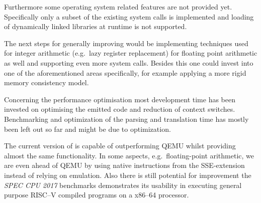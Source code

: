 Furthermore some operating system related features are not provided yet.
Specifically only a subset of the existing system calls is implemented and loading of dynamically linked libraries at runtime is not supported.

The next steps for generally improving \translatorname would be implementing techniques used for integer arithmetic (e.g.\ lazy register replacement) for floating point arithmetic as well and supporting even more system calls.
Besides this one could invest into one of the aforementioned areas specifically, for example applying a more rigid memory consistency model.

Concerning the performance optimisation most development time has been invested on optimising the emitted code and reduction of context switches.
Benchmarking and optimization of the parsing and translation time has mostly been left out so far and might be due to optimization.


The current version of \translatorname is capable of outperforming QEMU whilst providing almost the same functionality.
In some aspects, e.g.\ floating-point arithmetic, we are even ahead of QEMU by using native instructions from the SSE-extension instead of relying on emulation.
Also there is still potential for improvement the \textit{SPEC CPU 2017} benchmarks demonstrates its usability in executing general purpose RISC--V compiled programs on a x86--64 processor. %